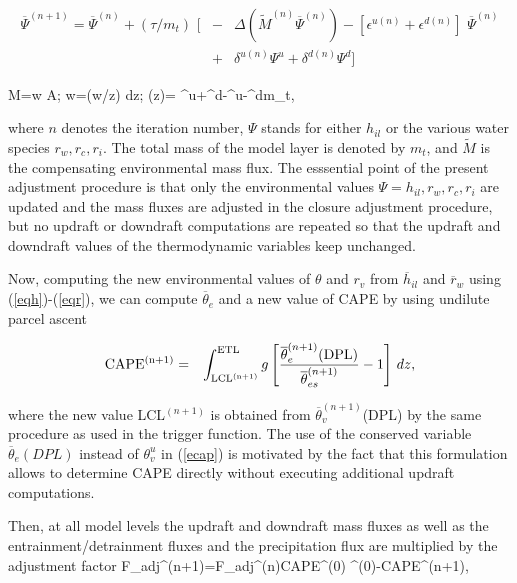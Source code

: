 \begin{eqnarray}
\overline{\Psi}^{(n+1)}=\overline{\Psi}^{(n)}+(\tau/m_t)\,\,
\bigg[&-&\Delta( \tilde M^{(n)}\overline{\Psi}^{(n)})-
[\epsilon^{u(n)}+\epsilon^{d(n)}]\,\,
\overline{\Psi}^{(n)}\nonumber\\
&+&\delta^{u(n)}\Psi^{u}+\delta^{d(n)}\Psi^{d}\bigg]
\label{eqTa}
\end{eqnarray}


\beq
\tilde M=\overline{\rho}\tilde w A;\quad
\tilde w=\int(\partial\tilde w/\partial z) dz;\quad
\left({\partial{}\over\partial z}\right)=
{\epsilon^u+\epsilon^d-\delta^u-\delta^d\over m_t},
\label{eqTb}
\eeq


\noindent
where $n$ denotes the iteration number,
$\Psi$ stands for either $h_{il}$ or the various water species  $r_w, r_c, r_i$.
The total mass of the model layer is denoted by $m_t$,
 and  $\tilde M$  is the compensating environmental mass flux.
The esssential point of the present adjustment procedure is that only
the environmental values  $\Psi= h_{il}, r_w, r_c, r_i$ are updated
and  the mass fluxes are adjusted
in the closure adjustment procedure, but no updraft or
downdraft computations are repeated so that the updraft and downdraft values
of the thermodynamic variables keep unchanged.

Now, computing the new environmental values of $\theta$ and $r_v$ from
$\overline{h}_{il}$ and $\overline{r}_w$
using (\ref{eqh})-(\ref{eqr}),
we can compute $\overline{\theta}_e$ and a new value of
CAPE  by using undilute parcel ascent

\begin{eqnarray}
{\rm CAPE^{(n+1)}}&=&
\int^{\rm ETL}_{\rm LCL^{(n+1)}} g
\left[ {
\overline\theta_e^{(n+1)}({\rm DPL})
\over\overline{\theta}_{es}^{(n+1)}  } -1 \right]\, dz,
\label{ecap}
\end{eqnarray}

\noindent
where the new value LCL$^{(n+1)}$ is obtained from
$\overline{\theta}_v^{(n+1)}$(DPL) by
the same procedure as used in the trigger function. The use of the
conserved variable $\overline{\theta}_{e}(DPL)$ instead of $\theta_v^u$
in (\ref{ecap}) is motivated by the fact that this formulation allows to
determine CAPE directly without executing additional updraft computations.

Then, at all model levels the updraft and downdraft mass fluxes as well as
the entrainment/detrainment fluxes and the precipitation flux
are multiplied by the adjustment factor
\beq
F_{adj}^{(n+1)}=F_{adj}^{(n)}{{\rm CAPE}^{(0)}
^{(0)}-{\rm CAPE}^{(n+1)}},
\label{eqFa}
\eeq

